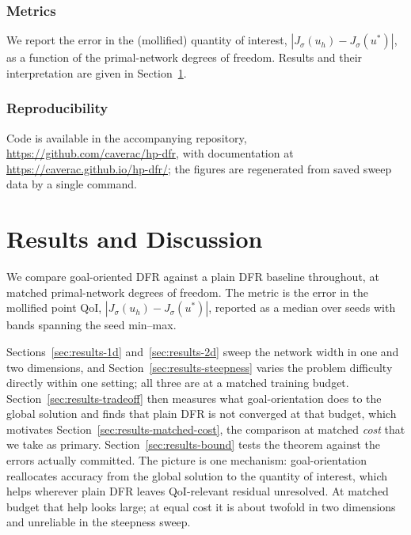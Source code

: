 \documentclass[preprint,11pt]{elsarticle}
\begin{document}
\subsubsection{Metrics}

We report the error in the (mollified) quantity of interest, $|J_\sigma(u_h) - J_\sigma(u^*)|$, as a function of the primal-network degrees of freedom. Results and their interpretation are given in Section~\ref{sec:results}.

\subsubsection{Reproducibility}

Code is available in the accompanying repository, \url{https://github.com/caverac/hp-dfr}, with documentation at \url{https://caverac.github.io/hp-dfr/}; the figures are regenerated from saved sweep data by a single command.

\section{Results and Discussion}
\label{sec:results}

We compare goal-oriented DFR against a plain DFR baseline throughout, at matched primal-network degrees of freedom. The metric is the error in the mollified point QoI, $|J_\sigma(u_h) - J_\sigma(u^*)|$, reported as a median over seeds with bands spanning the seed min--max.

Sections~\ref{sec:results-1d} and~\ref{sec:results-2d} sweep the network width in one and two dimensions, and Section~\ref{sec:results-steepness} varies the problem difficulty directly within one setting; all three are at a matched training budget. Section~\ref{sec:results-tradeoff} then measures what goal-orientation does to the global solution and finds that plain DFR is not converged at that budget, which motivates Section~\ref{sec:results-matched-cost}, the comparison at matched \emph{cost} that we take as primary. Section~\ref{sec:results-bound} tests the theorem against the errors actually committed. The picture is one mechanism: goal-orientation reallocates accuracy from the global solution to the quantity of interest, which helps wherever plain DFR leaves QoI-relevant residual unresolved. At matched budget that help looks large; at equal cost it is about twofold in two dimensions and unreliable in the steepness sweep.
\end{document}
